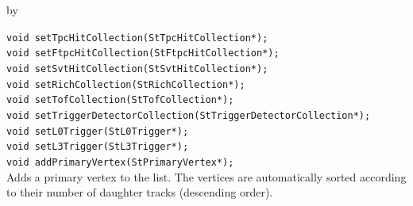 \documentclass[twoside]{article}
\newcommand{\entrylabel}[1]{\mbox{\textbf{{#1}}}\hfil}%
\newenvironment{entry}
{\begin{list}{}%
    {\renewcommand{\makelabel}{\entrylabel}%
     \setlength{\labelwidth}{90pt}%
     \setlength{\leftmargin}{\labelwidth}
     \advance\leftmargin by \labelsep%
      }%
    }%
  {\end{list}}
\newcommand{\Entrylabel}[1]%
{\raisebox{0pt}[1ex][0pt]{\makebox[\labelwidth][l]%
    {\parbox[t]{\labelwidth}{\hspace{0pt}\textbf{{#1}}}}}}
\newenvironment{Entry}%
{\renewcommand{\entrylabel}{\Entrylabel}\begin{entry}}%
  {\end{entry}}
\begin{document}
\begin{Entry}
    \verb+void setTpcHitCollection(StTpcHitCollection*);+\\

    \verb+void setFtpcHitCollection(StFtpcHitCollection*);+\\

    \verb+void setSvtHitCollection(StSvtHitCollection*);+\\

    \verb+void setRichCollection(StRichCollection*);+\\

    \verb+void setTofCollection(StTofCollection*);+\\

    \verb+void setTriggerDetectorCollection(StTriggerDetectorCollection*);+\\

    \verb+void setL0Trigger(StL0Trigger*);+\\
    
    \verb+void setL3Trigger(StL3Trigger*);+\\
    
    \verb+void addPrimaryVertex(StPrimaryVertex*);+\\
    Adds a primary vertex to the list. The vertices are
    automatically sorted according to their number of daughter
    tracks (descending order). 
    
\end{Entry}
\clearpage
\end{document}
